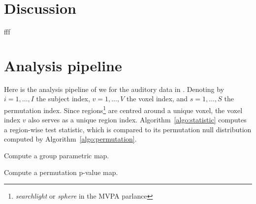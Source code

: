\documentclass[12pt,a4paper]{article}
\begin{document}
\section{Discussion}
\label{sec:discussion}



fff


















\appendix


\newpage

\section{Analysis pipeline}
\label{apx:analysis}

Here is the analysis pipeline of \cite{stelzer_statistical_2013} we for the auditory data in \cite{gilron_quantifying_2016}.
Denoting by 
$i=1,\dots,I$ the subject index, 
$v=1,\dots,V$ the voxel index, and 
$s = 1,\dots,S$ the permutation index. 
Since regions\footnote{\emph{searchlight} or \emph{sphere} in the MVPA parlance} are centred around a unique voxel, the voxel index $v$ also serves as a unique region index.
Algorithm~\ref{algo:statistic} computes a region-wise test statistic, which is compared to its permutation null distribution computed by Algorithm~\ref{algo:permutation}.


\begin{algorithm}[H]
\caption{Compute a group parametric map.}
\label{algo:statistic}

\end{algorithm}


\begin{algorithm}[H]
\caption{Compute a permutation p-value map.} 
\label{algo:permutation}

\end{algorithm}
\end{document}
